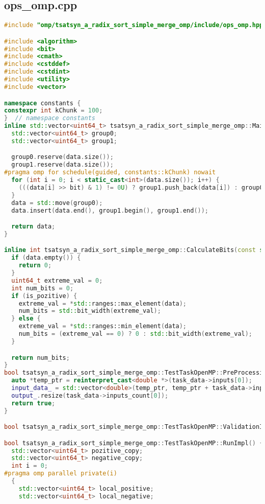\documentclass[a4paper,12pt]{article}
\begin{document}
\subsection{ops\_omp.cpp}
\begin{lstlisting}[language=C++,
    breaklines=true,       % Автоматический перенос строк
    basicstyle=\small\ttfamily, % Уменьшенный шрифт
    columns=fullflexible ]
    #include "omp/tsatsyn_a_radix_sort_simple_merge_omp/include/ops_omp.hpp"

#include <algorithm>
#include <bit>
#include <cmath>
#include <cstddef>
#include <cstdint>
#include <utility>
#include <vector>

namespace constants {
constexpr int kChunk = 100;
}  // namespace constants
inline std::vector<uint64_t> tsatsyn_a_radix_sort_simple_merge_omp::MainSort(std::vector<uint64_t> &data, int bit) {
  std::vector<uint64_t> group0;
  std::vector<uint64_t> group1;

  group0.reserve(data.size());
  group1.reserve(data.size());
#pragma omp for schedule(guided, constants::kChunk) nowait
  for (int i = 0; i < static_cast<int>(data.size()); i++) {
    (((data[i] >> bit) & 1) != 0U) ? group1.push_back(data[i]) : group0.push_back(data[i]);
  }
  data = std::move(group0);
  data.insert(data.end(), group1.begin(), group1.end());

  return data;
}

inline int tsatsyn_a_radix_sort_simple_merge_omp::CalculateBits(const std::vector<uint64_t> &data, bool is_pozitive) {
  if (data.empty()) {
    return 0;
  }
  uint64_t extreme_val = 0;
  int num_bits = 0;
  if (is_pozitive) {
    extreme_val = *std::ranges::max_element(data);
    num_bits = std::bit_width(extreme_val);
  } else {
    extreme_val = *std::ranges::min_element(data);
    num_bits = (extreme_val == 0) ? 0 : std::bit_width(extreme_val);
  }

  return num_bits;
}
bool tsatsyn_a_radix_sort_simple_merge_omp::TestTaskOpenMP::PreProcessingImpl() {
  auto *temp_ptr = reinterpret_cast<double *>(task_data->inputs[0]);
  input_data_ = std::vector<double>(temp_ptr, temp_ptr + task_data->inputs_count[0]);
  output_.resize(task_data->inputs_count[0]);
  return true;
}

bool tsatsyn_a_radix_sort_simple_merge_omp::TestTaskOpenMP::ValidationImpl() { return task_data->inputs_count[0] != 0; }

bool tsatsyn_a_radix_sort_simple_merge_omp::TestTaskOpenMP::RunImpl() {
  std::vector<uint64_t> pozitive_copy;
  std::vector<uint64_t> negative_copy;
  int i = 0;
#pragma omp parallel private(i)
  {
    std::vector<uint64_t> local_positive;
    std::vector<uint64_t> local_negative;


\end{lstlisting}
\end{document}
